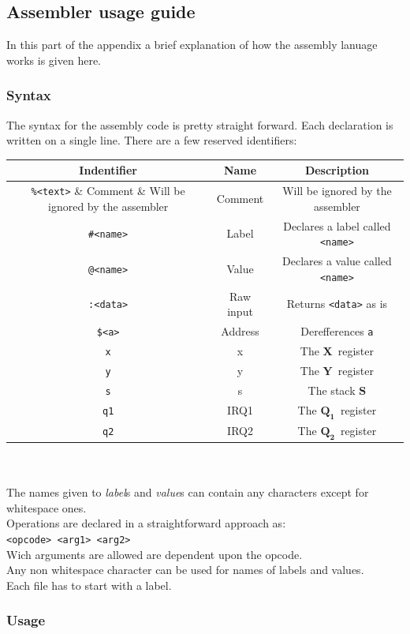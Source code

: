 \documentclass{article}
\newcommand{\V}{\verb}
\newcommand{\x}{$\textbf{X}$}
\newcommand{\y}{$\textbf{Y}$}
\newcommand{\s}{$\textbf{S}$}
\newcommand{\q}{$\textbf{Q}_{\textbf{1}}$}
\newcommand{\qq}{$\textbf{Q}_{\textbf{2}}$}
\begin{document}
\subsection{Assembler usage guide}

In this part of the appendix a brief explanation of how the assembly lanuage
works is given here.
\subsubsection{Syntax}
The syntax for the assembly code is pretty straight forward. Each declaration is
written on a single line. There are a few reserved identifiers:

\begin{tabular}{|c | c| c |}
\hline
Indentifier & Name & Description\\
\hline
\V+%
\hline
\V+#<name>+ & Label & Declares a label called \V+<name>+ \\
\hline
\V+@<name>+ & Value & Declares a value called \V+<name>+\\
\hline
\V+:<data>+ & Raw input & Returns \V+<data>+ as is \\
\hline
\verb+$<a>+ & Address & Derefferences \V+a+\\
\hline
\V+x+ & x & The \x \ register \\
\hline
\V+y+ & y & The \y \ register \\
\hline
\V+s+ & s & The stack \s \\
\hline
\V+q1+ & IRQ1 & The \q \ register\\
\hline
\V+q2+ & IRQ2 & The \qq \ register\\
\hline
\end{tabular}
\\
\\
The names given to \emph{label}s and \emph{value}s can contain any characters except for
whitespace ones.\\
Operations are declared in a straightforward approach as:\\
\V+<opcode> <arg1> <arg2>+ \\
Wich arguments are allowed are dependent upon the opcode.\\
Any non whitespace character can be used for names of labels and values.\\
Each file has to start with a label.

\subsubsection{Usage}
\end{document}
